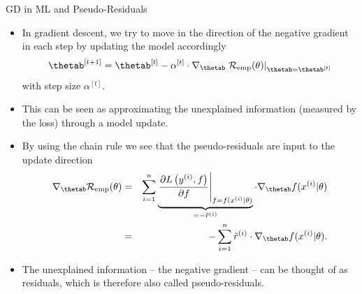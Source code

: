 \begin{vbframe}{GD in ML and Pseudo-Residuals}

\begin{itemize}
	\item In gradient descent, we try to move in the direction of the negative gradient in each step by updating the model accordingly 
	$$
	 \thetab^{[t + 1]} = \thetab^{[t]} - \alpha^{[t]} \cdot \nabla_{\thetab} \left.\risket\right|_{\thetab = \thetab^{[t]}}	
	$$
	with step size $\alpha^{[t]}$. 
	\item This can be seen as approximating the unexplained information (measured by the loss) through a model update. 
	\framebreak 
	\item By using the chain rule we see that the pseudo-residuals are input to the update direction
	\begin{eqnarray*}
	\nabla_{\thetab} \risket &=&\sumin \underbrace{\left.\frac{\partial L\left(\yi, f\right)}{\partial f} \right|_{f = \fxit} }_{= - \tilde r^{(i)}}
	\cdot \nabla_{\thetab} \fxit \\ 
	&=& - \sumin \tilde r^{(i)} \cdot \nabla_{\thetab} \fxit.
	\end{eqnarray*}
	\item The unexplained information -- the negative gradient -- can be thought of as residuals, which is therefore also called pseudo-residuals. 
\end{itemize}	

\end{vbframe}


\endlecture

